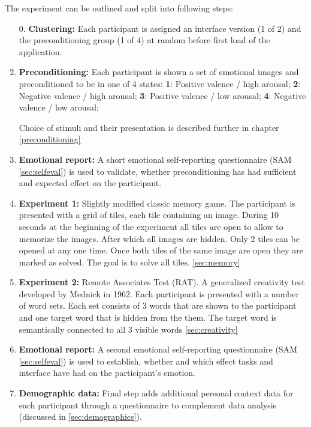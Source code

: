	The experiment can be outlined and split into following steps:
	
	\begin{enumerate}
		
		\item[0.] \textbf{Clustering:} Each participant is assigned an interface version (1 of 2) and the preconditioning group (1 of 4) at random before first load of the application.
		
		\item \textbf{Preconditioning:} Each participant is shown a set of emotional images and preconditioned to be in one of 4 states:
			\textbf{1}: Positive valence / high arousal;
			\textbf{2}: Negative valence / high arousal;
			\textbf{3}: Positive valence / low arousal;
			\textbf{4}: Negative valence / low arousal;
			
		Choice of stimuli and their presentation is described further in chapter \ref{preconditioning}
			
		\item \textbf{Emotional report:} A short emotional self-reporting questionnaire (SAM \ref{sec:selfeval}) is used to validate, whether preconditioning has had sufficient and expected effect on the participant.
		
		\item \textbf{Experiment 1:} Slightly modified classic memory game. The participant is presented with a grid of tiles, each tile containing an image. During 10 seconds at the beginning of the experiment all tiles are open to allow to memorize the images. After which all images are hidden. Only 2 tiles can be opened at any one time. Once both tiles of the same image are open they are marked as solved. The goal is to solve all tiles. \ref{sec:memory}
		
		\item \textbf{Experiment 2:} Remote Associates Test (RAT). A generalized creativity test developed by Mednick \cite{Mednick1962} in 1962. Each participant is presented with a number of word sets. Each set consists of 3 words that are shown to the participant and one target word that is hidden from the them. The target word is semantically connected to all 3 visible words \ref{sec:creativity}
		
		\item \textbf{Emotional report:} A second emotional self-reporting questionnaire (SAM \ref{sec:selfeval}) is used to establish, whether and which effect tasks and interface have had on the participant's emotion.
		
		\item \textbf{Demographic data:} Final step adds additional personal context data for each participant through a questionnaire to complement data analysis (discussed in \ref{sec:demographics}).
		
	\end{enumerate}
	
